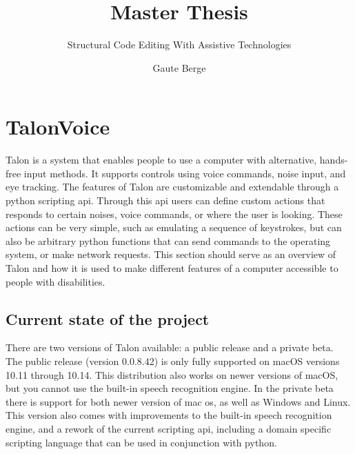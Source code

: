 \documentclass[a4paper,english]{ifimaster}
\title{Master Thesis}
\subtitle{Structural Code Editing With Assistive Technologies}
\author{Gaute Berge}
\begin{document}

\frontmatter{}



\mainmatter{}

\section{TalonVoice}
Talon is a system that enables people to use a computer with alternative, hands-free input methods.
It supports controls using voice commands, noise input, and eye tracking.
The features of Talon are customizable and extendable through a python scripting api.
Through this api users can define custom actions that responds to certain noises, voice commands, or where the user is looking.
These actions can be very simple, such as emulating a sequence of keystrokes, but can also be arbitrary python functions
that can send commands to the operating system, or make network requests.
This section should serve as an overview of Talon and how it is used to make different features of a computer accessible to people with disabilities.

\subsection{Current state of the project}
There are two versions of Talon available: a public release and a private beta.
The public release (version 0.0.8.42) is only fully supported on macOS versions 10.11 through 10.14.
This distribution also works on newer versions of macOS, but you cannot use the built-in speech recognition engine.
In the private beta there is support for both newer version of mac os, as well as Windows and Linux.
This version also comes with improvements to the built-in speech recognition engine, and a rework of the current scripting api, including a domain specific scripting language that can be used in conjunction with python.
\end{document}
